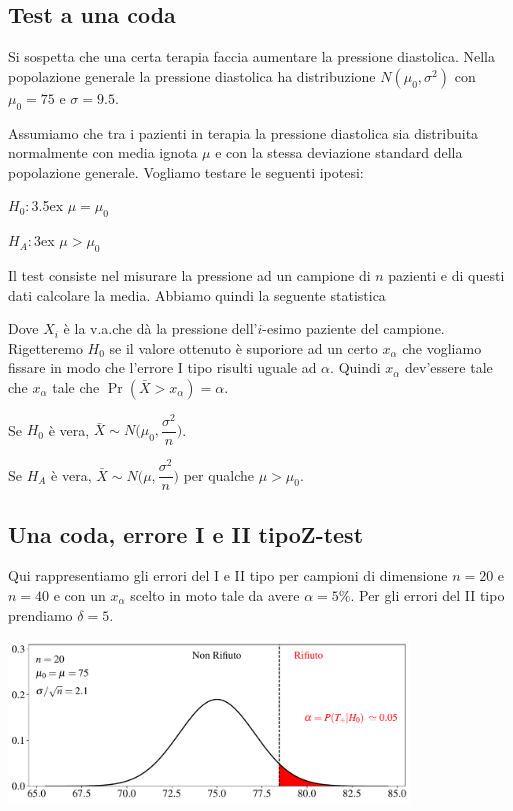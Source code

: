 \documentclass[12pt,openany]{book}
\theoremstyle{mio}
\theoremstyle{liscio}
\begin{document}
\subsection{Test a una coda}
Si sospetta che una certa terapia faccia aumentare la pressione diastolica. Nella popolazione generale la pressione diastolica ha distribuzione $N(\mu_0,\sigma^2)$ con $\mu_0=75$ e $\sigma=9.5$. 

Assumiamo che tra i pazienti in terapia la pressione diastolica sia distribuita normalmente con media ignota $\mu$ e con la stessa deviazione standard della popolazione generale. Vogliamo testare le seguenti ipotesi:

$H_0:$\kern3.5ex $\mu=\mu_0$

$H_A:$\kern3ex $\mu>\mu_0$

Il test consiste nel misurare la pressione ad un campione di $n$ pazienti e di questi dati calcolare la media. Abbiamo quindi la seguente statistica


Dove $X_i$ è la v.a.\@ che dà la pressione dell'$i$-esimo paziente del campione. Rigetteremo $H_0$ se il
valore ottenuto è suporiore ad un certo $x_\alpha$ che vogliamo fissare in modo che l'errore I tipo risulti uguale ad $\alpha$. Quindi $x_\alpha$ dev'essere tale che $x_\alpha$ tale che $\Pr(\bar X>x_\alpha)=\alpha$.

Se $H_0$ è vera, $\bar X\sim N\bigg(\mu_0,\dfrac{\sigma^2}{n}\bigg)$.

Se $H_A$ è vera, $\bar X\sim N\bigg(\mu,\dfrac{\sigma^2}{n}\bigg)$ per qualche $\mu>\mu_0$.

% 



\hfill{}\clearpage\subsection{Una coda, errore I e II tipo\hfill Z-test}


Qui rappresentiamo gli errori del I e II tipo per campioni di dimensione $n=20$ e $n= 40$ e con un $x_\alpha$ scelto in moto tale da avere $\alpha=5\%$. Per gli errori del II tipo prendiamo $\delta=5$.

\hfil\includegraphics[width=0.8\textwidth]{figure/Z-test_01.pdf}
\end{document}

